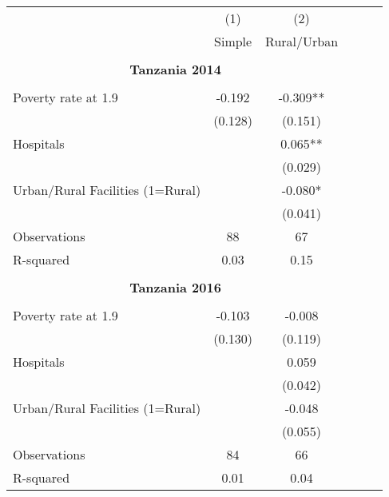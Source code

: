 \begin{tabular}{l*{5}{c}} \hline\hline
                &\multicolumn{1}{c}{(1)}&\multicolumn{1}{c}{(2)}\\
                &\multicolumn{1}{c}{Simple}&\multicolumn{1}{c}{Rural/Urban}\\
\hline \\ \multicolumn{3}{c}{\textbf{Tanzania 2014}} \\\\[-1ex]
Poverty rate at 1.9&   -0.192   &   -0.309** \\
                &  (0.128)   &  (0.151)   \\
Hospitals       &            &    0.065** \\
                &            &  (0.029)   \\
Urban/Rural Facilities (1=Rural)&            &   -0.080*  \\
                &            &  (0.041)   \\
\hline
Observations    &       88   &       67   \\
R-squared       &     0.03   &     0.15   \\
\hline \\ \multicolumn{3}{c}{\textbf{Tanzania 2016}} \\\\[-1ex]
Poverty rate at 1.9&   -0.103   &   -0.008   \\
                &  (0.130)   &  (0.119)   \\
Hospitals       &            &    0.059   \\
                &            &  (0.042)   \\
Urban/Rural Facilities (1=Rural)&            &   -0.048   \\
                &            &  (0.055)   \\
\hline
Observations    &       84   &       66   \\
R-squared       &     0.01   &     0.04   \\
\hline\hline \end{tabular}
